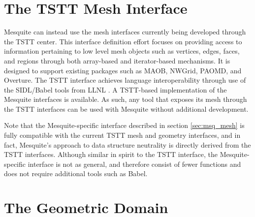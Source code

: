 

\section{The TSTT Mesh Interface} 
\label{sec:TSTT}

Mesquite can instead use the mesh interfaces currently
being developed through the TSTT center.  This interface definition
effort focuses on providing access to information pertaining to low
level mesh objects such as vertices, edges, faces, and regions through
both array-based and iterator-based mechanisms.  It is designed to
support existing packages such as MAOB, NWGrid, PAOMD, and Overture. 
The TSTT interface achieves language interoperability
through use of the SIDL/Babel tools from LLNL \cite{babel}.
A TSTT-based implementation of the Mesquite
interfaces is available.  As such, any tool that exposes its
mesh through the TSTT interfaces can be used with Mesquite without
additional development.

Note that the Mesquite-specific interface described in section \ref{sec:msq_mesh} is fully compatible
with the current TSTT mesh and geometry interfaces, and in fact,
Mesquite's approach to data structure neutrality is directly derived
from the TSTT interfaces.  Although similar in spirit to the TSTT
interface, the Mesquite-specific interface is not as general, and 
therefore consist of fewer
functions and does not require additional tools such as Babel.

\section{The Geometric Domain}
\label{sec:geometry}


